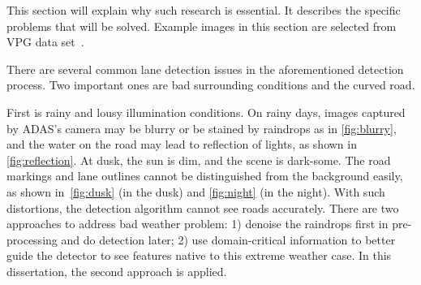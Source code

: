 \begin{spacing}{1.5}
This section will explain why such research is essential. It describes the specific problems that will be solved. Example images in this section are selected from VPG data set~\cite{lee2017vpgnet}.

There are several common lane detection issues in the aforementioned detection process. Two important ones are bad surrounding conditions and the curved road.

First is rainy and lousy illumination conditions. On rainy days, images captured by ADAS’s camera may be blurry or be stained by raindrops as in \autoref{fig:blurry}, and the water on the road may lead to reflection of lights, as shown in \autoref{fig:reflection}. At dusk, the sun is dim, and the scene is dark-some. The road markings and lane outlines cannot be distinguished from the background easily, as shown in~\autoref{fig:dusk} (in the dusk) and \autoref{fig:night} (in the night). With such distortions, the detection algorithm cannot see roads accurately. There are two approaches to address bad weather problem: 1) denoise the raindrops first in pre-processing and do detection later; 2) use domain-critical information to better guide the detector to see features native to this extreme weather case. In this dissertation, the second approach is applied.



\end{spacing}
